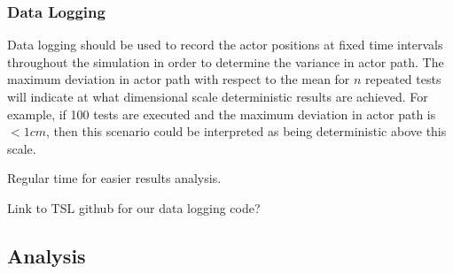 \documentclass[letterpaper, 10 pt, journal, twoside]{IEEEtran}
\begin{document}
\subsubsection{Data Logging}

Data logging should be used to record the actor positions at fixed time intervals throughout the simulation in order to determine the variance in actor path. The maximum deviation in actor path with respect to the mean for $n$ repeated tests will indicate at what dimensional scale deterministic results are achieved. For example, if 100 tests are executed and the maximum deviation in actor path is $<1cm$, then this scenario could be interpreted as being deterministic above this scale. 

Regular time for easier results analysis.

Link to TSL github for our data logging code?


\subsection{Analysis}






\end{document}
